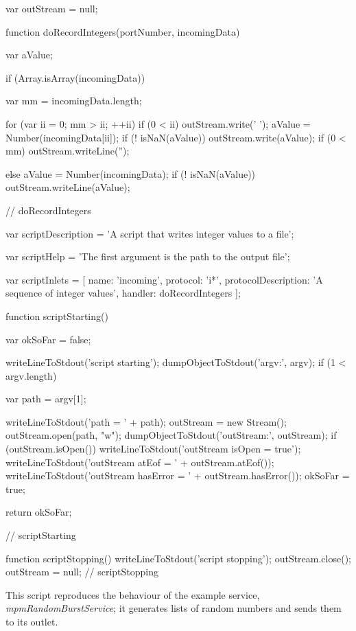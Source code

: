 \codeBegin{}
\begin{listing}[5]{1}
var outStream = null;

function doRecordIntegers(portNumber, incomingData)
{
    var aValue;
    
    if (Array.isArray(incomingData))
    {
        var mm = incomingData.length;
        
        for (var ii = 0; mm > ii; ++ii)
        {
            if (0 < ii)
            {
                outStream.write(' ');
            }
            aValue = Number(incomingData[ii]);
            if (! isNaN(aValue))
            {
                outStream.write(aValue);
            }
        }
        if (0 < mm)
        {
            outStream.writeLine('');
        }
    }
    else
    {
        aValue = Number(incomingData);
        if (! isNaN(aValue))
        {
            outStream.writeLine(aValue);
        }
    }
} // doRecordIntegers

var scriptDescription = 'A script that writes integer values to a file';

var scriptHelp = 'The first argument is the path to the output file';

var scriptInlets = [ { name: 'incoming', protocol: 'i*',
                        protocolDescription: 'A sequence of integer values',
                        handler: doRecordIntegers } ];

function scriptStarting()
{
    var okSoFar = false;
    
    writeLineToStdout('script starting');
    dumpObjectToStdout('argv:', argv);
    if (1 < argv.length)
    {
        var path = argv[1];
        
        writeLineToStdout('path = ' + path);
        outStream = new Stream();
        outStream.open(path, "w");
        dumpObjectToStdout('outStream:', outStream);
        if (outStream.isOpen())
        {
            writeLineToStdout('outStream isOpen = true');
            writeLineToStdout('outStream atEof = ' + outStream.atEof());
            writeLineToStdout('outStream hasError = ' + outStream.hasError());
        }
        okSoFar = true;
    }
    return okSoFar;
} // scriptStarting

function scriptStopping()
{
    writeLineToStdout('script stopping');
    outStream.close();
    outStream = null;
} // scriptStopping
\end{listing}
\codeEnd{}
\secondaryEnd{}
\condPage{}
This script reproduces the behaviour of the example service, \emph{mpmRandomBurstService};
it generates lists of random numbers and sends them to its outlet.\\

